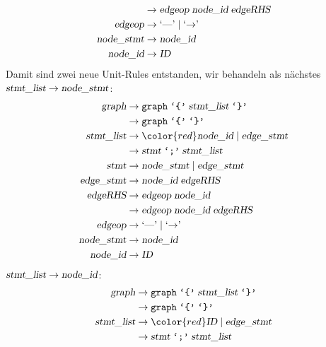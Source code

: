 \begin{loesung}
\begin{teilaufgaben}
\begin{align*}
                   &\rightarrow \textsl{edgeop}\; \textsl{node\_id}\; \textsl{edgeRHS}\\
\textsl{edgeop}    &\rightarrow \textrm{`\text{---}'}\; |\; \textrm{`$\rightarrow$'}\; \\
\textsl{node\_stmt}&\rightarrow \textsl{node\_id} \\
\textsl{node\_id}  &\rightarrow \textsl{ID}
\end{align*}
Damit sind zwei neue Unit-Rules entstanden, wir behandeln als nächstes
$\textsl{stmt\_list}\to\textsl{node\_stmt}$:
\begin{align*}
\textsl{graph}     &\rightarrow \texttt{graph}\; \texttt{`\{'}\; \textsl{stmt\_list}\; \texttt{`\}'} \\
                   &\rightarrow \texttt{graph}\; \texttt{`\{'}\; \texttt{`\}'} \\
\textsl{stmt\_list}&\rightarrow {\color{red}\textsl{node\_id}}\; |\;
                                \textsl{edge\_stmt} \\
                   &\rightarrow \textsl{stmt}\; \texttt{`;'}\; \textsl{stmt\_list}\\
\textsl{stmt}      &\rightarrow \textsl{node\_stmt}\; |\;
                                \textsl{edge\_stmt} \\
\textsl{edge\_stmt}&\rightarrow \textsl{node\_id}\; \textsl{edgeRHS} \\
\textsl{edgeRHS}   &\rightarrow \textsl{edgeop}\; \textsl{node\_id}\\
                   &\rightarrow \textsl{edgeop}\; \textsl{node\_id}\; \textsl{edgeRHS}\\
\textsl{edgeop}    &\rightarrow \textrm{`\text{---}'}\; |\; \textrm{`$\rightarrow$'}\; \\
\textsl{node\_stmt}&\rightarrow \textsl{node\_id} \\
\textsl{node\_id}  &\rightarrow \textsl{ID}
\end{align*}
$\textsl{stmt\_list}\to\textsl{node\_id}$:
\begin{align*}
\textsl{graph}     &\rightarrow \texttt{graph}\; \texttt{`\{'}\; \textsl{stmt\_list}\; \texttt{`\}'} \\
                   &\rightarrow \texttt{graph}\; \texttt{`\{'}\; \texttt{`\}'} \\
\textsl{stmt\_list}&\rightarrow {\color{red}\textsl{ID}}\; |\;
                                \textsl{edge\_stmt} \\
                   &\rightarrow \textsl{stmt}\; \texttt{`;'}\; \textsl{stmt\_list}\\

\end{align*}
\end{teilaufgaben}
\end{loesung}
